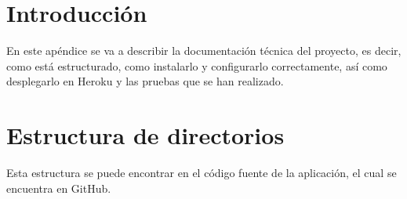 
\section{Introducción}
En este apéndice se va a describir la documentación técnica del proyecto, es decir, como está estructurado, como instalarlo y configurarlo correctamente, así como desplegarlo en Heroku y las pruebas que se han realizado.

\section{Estructura de directorios}
Esta estructura se puede encontrar en el código fuente de la aplicación, el cual se encuentra en GitHub.

